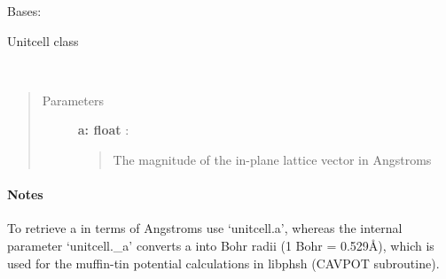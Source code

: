 \documentclass[letterpaper,10pt,english]{sphinxmanual}
\begin{document}
\begin{fulllineitems}
\label{modules:phaseshifts.model.Unitcell}
Bases: 

Unitcell class

\begin{fulllineitems}
\label{modules:phaseshifts.model.Unitcell.set_a}~\begin{quote}\begin{description}
\item[{Parameters}] \leavevmode
\textbf{a: float} :
\begin{quote}

The magnitude of the in-plane lattice vector in Angstroms
\end{quote}

\end{description}\end{quote}
\paragraph{Notes}

To retrieve a in terms of Angstroms use `unitcell.a', whereas the
internal parameter `unitcell.\_a' converts a into Bohr radii 
(1 Bohr = 0.529Å), which is used for the muffin-tin potential
calculations in libphsh (CAVPOT subroutine).

\end{fulllineitems}


\begin{fulllineitems}
\label{modules:phaseshifts.model.Unitcell.set_alpha}
\end{fulllineitems}


\begin{fulllineitems}
\label{modules:phaseshifts.model.Unitcell.set_beta}
\end{fulllineitems}



\end{fulllineitems}
\end{document}
